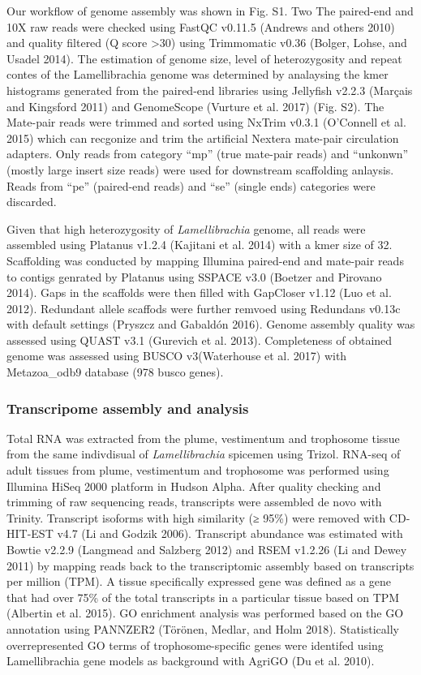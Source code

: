 \documentclass[]{article}
\begin{document}
Our workflow of genome assembly was shown in Fig. S1. Two The paired-end
and 10X raw reads were checked using FastQC v0.11.5 (Andrews and others
2010) and quality filtered (Q score \textgreater{}30) using Trimmomatic
v0.36 (Bolger, Lohse, and Usadel 2014). The estimation of genome size,
level of heterozygosity and repeat contes of the Lamellibrachia genome
was determined by analaysing the kmer histograms generated from the
paired-end libraries using Jellyfish v2.2.3 (Marçais and Kingsford 2011)
and GenomeScope (Vurture et al. 2017) (Fig. S2). The Mate-pair reads
were trimmed and sorted using NxTrim v0.3.1 (O'Connell et al. 2015)
which can recgonize and trim the artificial Nextera mate-pair
circulation adapters. Only reads from category ``mp'' (true mate-pair
reads) and ``unkonwn'' (mostly large insert size reads) were used for
downstream scaffolding anlaysis. Reads from ``pe'' (paired-end reads)
and ``se'' (single ends) categories were discarded.

Given that high heterozygosity of \emph{Lamellibrachia} genome, all
reads were assembled using Platanus v1.2.4 (Kajitani et al. 2014) with a
kmer size of 32. Scaffolding was conducted by mapping Illumina
paired-end and mate-pair reads to contigs genrated by Platanus using
SSPACE v3.0 (Boetzer and Pirovano 2014). Gaps in the scaffolds were then
filled with GapCloser v1.12 (Luo et al. 2012). Redundant allele scaffods
were further remvoed using Redundans v0.13c with default settings
(Pryszcz and Gabaldón 2016). Genome assembly quality was assessed using
QUAST v3.1 (Gurevich et al. 2013). Completeness of obtained genome was
assessed using BUSCO v3(Waterhouse et al. 2017) with Metazoa\_odb9
database (978 busco genes).

\hypertarget{transcripome-assembly-and-analysis}{%
\subsubsection{Transcripome assembly and
analysis}\label{transcripome-assembly-and-analysis}}

Total RNA was extracted from the plume, vestimentum and trophosome
tissue from the same indivdisual of \emph{Lamellibrachia} spicemen using
Trizol. RNA-seq of adult tissues from plume, vestimentum and trophosome
was performed using Illumina HiSeq 2000 platform in Hudson Alpha. After
quality checking and trimming of raw sequencing reads, transcripts were
assembled de novo with Trinity. Transcript isoforms with high similarity
(≥ 95\%) were removed with CD-HIT-EST v4.7 (Li and Godzik 2006).
Transcript abundance was estimated with Bowtie v2.2.9 (Langmead and
Salzberg 2012) and RSEM v1.2.26 (Li and Dewey 2011) by mapping reads
back to the transcriptomic assembly based on transcripts per million
(TPM). A tissue specifically expressed gene was defined as a gene that
had over 75\% of the total transcripts in a particular tissue based on
TPM (Albertin et al. 2015). GO enrichment analysis was performed based
on the GO annotation using PANNZER2 (Törönen, Medlar, and Holm 2018).
Statistically overrepresented GO terms of trophosome-specific genes were
identifed using Lamellibrachia gene models as background with AgriGO (Du
et al. 2010).
\end{document}
